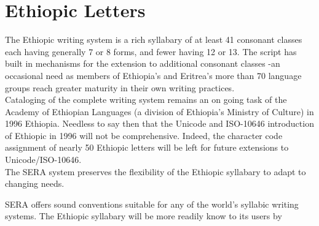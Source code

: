 \section{Ethiopic Letters}

The Ethiopic writing system is a rich syllabary of at least 41
consonant classes each having generally 7 or 8 forms, and fewer
having 12 or 13.  The script has built in mechanisms for the 
extension to additional consonant classes -an occasional need
as members of Ethiopia's and Eritrea's more than 70 language groups
reach greater maturity in their own writing practices. \\

Cataloging of the complete writing system remains an on going
task of the Academy of Ethiopian Languages (a division of Ethiopia's
Ministry of Culture) in 1996 Ethiopia.  Needless to say then that
the Unicode and ISO-10646 introduction of Ethiopic in 1996 will
not be comprehensive.  Indeed, the character code assignment of nearly
50 Ethiopic letters will be left for future extensions to
Unicode/ISO-10646. \\
The SERA system preserves the flexibility of the 
Ethiopic syllabary to adapt to changing needs.  
\newpage

\noi
SERA offers sound conventions suitable for any of 
the world's syllabic writing systems.  The Ethiopic 
syllabary will be more readily know to its users by \\

